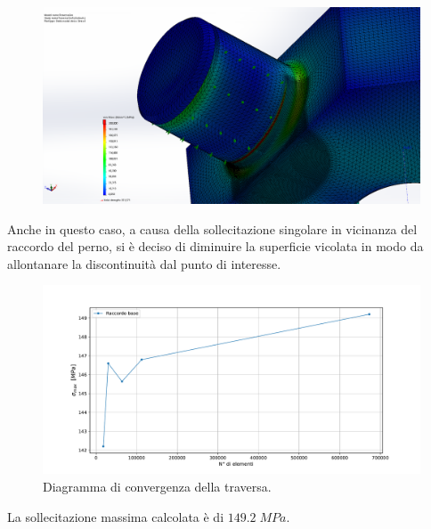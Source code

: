 \begin{figure}[H]
\centering
  \includegraphics[width=.7\textwidth]{imgs/fem/TraversaSim1}
\caption{}
\label{fig:GamboGancioConv}
\end{figure}
Anche in questo caso, a causa della sollecitazione singolare in vicinanza del raccordo del perno, si è deciso di diminuire la superficie vicolata in modo da allontanare la discontinuità dal punto di interesse.
\begin{figure}[H]
\centering
  \includegraphics[width=.6\textwidth]{imgs/fem/TraversaConv}
\caption{Diagramma di convergenza della traversa.}
\label{fig:GamboGancioConv}
\end{figure}
La sollecitazione massima calcolata è di $149.2 \; MPa$.
